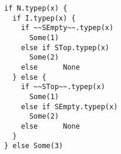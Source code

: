 \begin{lstlisting}[style=scalaioScala]
if N.typep(x) {
  if I.typep(x) {
    if ~~SEmpty~~.typep(x)
      Some(1)
    else if STop.typep(x)
      Some(2)
    else      None
  } else {
    if ~~STop~~.typep(x)
      Some(1)
    else if SEmpty.typep(x)
      Some(2)
    else      None
  }
} else Some(3)
\end{lstlisting}
